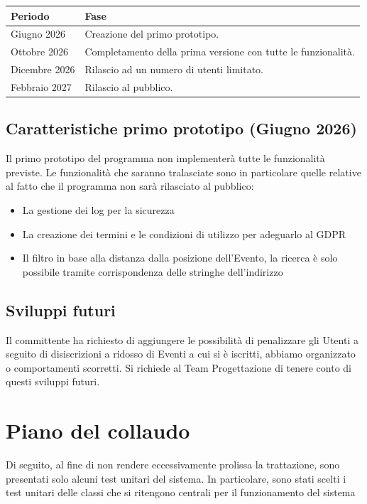 \documentclass[12pt,a4paper]{report}
\begin{document}
\vspace{0.5cm}
\begin{tabularx}{\textwidth}{|X|X|}
    \hline
    \rowcolor{studyColor} \textbf{Periodo} & \textbf{Fase} \\ \hline
    \endhead
    Giugno 2026 & Creazione del primo prototipo. \\ \hline
    Ottobre 2026 & Completamento della prima versione con tutte le funzionalità. \\ \hline
    Dicembre 2026 & Rilascio ad un numero di utenti limitato. \\ \hline
    Febbraio 2027 & Rilascio al pubblico. \\ \hline
\end{tabularx}

\subsection{Caratteristiche primo prototipo (Giugno 2026)}
Il primo prototipo del programma non implementerà tutte le funzionalità previste. Le funzionalità che saranno tralasciate sono in particolare quelle relative al fatto che il programma non sarà rilasciato al pubblico:
\begin{itemize}
    \item La gestione dei log per la sicurezza
    \item La creazione dei termini e le condizioni di utilizzo per adeguarlo al GDPR
    \item Il filtro in base alla distanza dalla posizione dell'Evento, la ricerca è solo possibile tramite corrispondenza delle stringhe dell'indirizzo
\end{itemize}

\subsection{Sviluppi futuri}
Il committente ha richiesto di aggiungere le possibilità di penalizzare gli Utenti a seguito di disiscrizioni a ridosso di Eventi a cui si è iscritti, abbiamo organizzato o comportamenti scorretti.
Si richiede al Team Progettazione di tenere conto di questi sviluppi futuri.

\newpage
\section{Piano del collaudo}
Di seguito, al fine di non rendere eccessivamente prolissa la trattazione, sono presentati solo alcuni test unitari del sistema.
In particolare, sono stati scelti i test unitari delle classi che si ritengono centrali per il funzionamento del sistema
\end{document}
